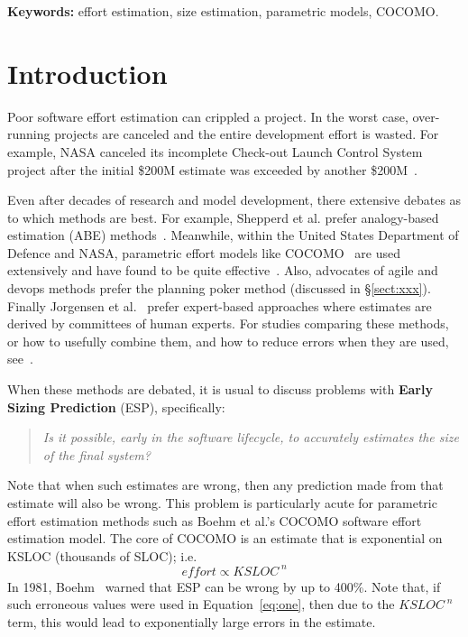 \documentclass[final,twocolumn,5p]{elsarticle}
\newcommand{\tion}[1]{\S\ref{sect:#1}}
\newcommand{\eq}[1]{Equation~\ref{eq:#1}}
\theoremstyle{break}
\begin{document}

 
\vspace{1mm}
\noindent
{\bf Keywords:} effort estimation, size estimation, parametric models, COCOMO.
{} %

\section{Introduction}
Poor software effort estimation can crippled a project.
In
the worst case, over-running projects are canceled and
the entire development effort is wasted. For example,
NASA canceled its incomplete Check-out Launch Control
System project after the initial \$200M estimate was
exceeded by another \$200M~\cite{clcs03}.

Even after decades of research and model
development, there extensive debates as to which
methods are best.  For example, Shepperd et
al. prefer analogy-based estimation (ABE)
methods~\cite{Shepperd1997}.  Meanwhile, within the
United States Department of Defence and NASA,
parametric effort models like
COCOMO~\cite{Boehm1981} are used extensively and
have found to be quite effective~\cite{Lum2002}.
Also, advocates of agile and devops methods prefer
the planning poker method (discussed in \tion{xxx}).
Finally Jorgensen et al.~\cite{jorgensen09} prefer
expert-based approaches where estimates are derived
by committees of human experts.  For studies
comparing these methods, or how to usefully combine
them, and how to reduce errors when they are used,
see~\cite{koc11b,Minku2013,garg15,me13a,koc11b}.

When these methods are debated, it is usual to discuss problems with {\bf Early Sizing Prediction} (ESP),
specifically:
\begin{quote}
 {\em Is it possible, early in the software lifecycle,
    to accurately estimates the size of the final system?}
  \end{quote}
Note that when such estimates are wrong, then any prediction made from that estimate
will also be wrong. This problem is particularly acute for parametric effort estimation
methods such as Boehm et al.'s COCOMO software effort estimation model.
The core of COCOMO  is an estimate that is exponential on KSLOC (thousands of SLOC); i.e.
\begin{equation}\label{eq:one}
\mathit{effort} \propto \mathit{KSLOC}^{\; n}
\end{equation}
In 1981, Boehm~\cite{boehm81} warned that ESP can be wrong by up to 400\%.
Note that, if such erroneous values were used in \eq{one}, then due to the $ \mathit{KSLOC}^{\; n}$
term, this would lead to  exponentially large errors in the estimate.
\end{document}
